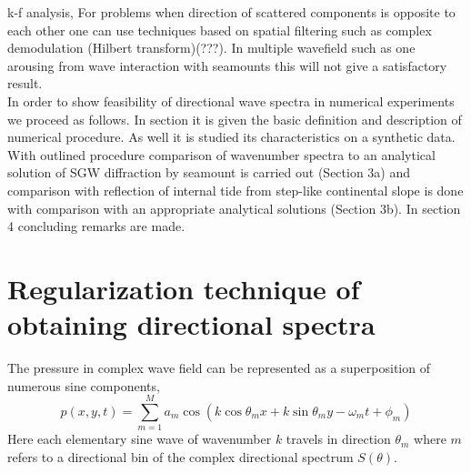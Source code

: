 k-f analysis, For problems when direction of scattered components is opposite to each other one can use techniques based on spatial filtering such as complex demodulation (Hilbert transform)\cite{mercier2008reflection}(???). In multiple wavefield such as one arousing from wave interaction with seamounts this will not give a satisfactory result.\\
In order to show feasibility of directional wave spectra in numerical experiments we proceed as follows. In section it is given the basic definition and description of numerical procedure. As well it is studied its characteristics on a synthetic data. With outlined procedure comparison of wavenumber spectra to an analytical solution of SGW diffraction by seamount is carried out (Section 3a) and comparison with reflection of internal tide from step-like continental slope is done with comparison with an appropriate analytical solutions (Section 3b). In section 4 concluding remarks are made.

\section{Regularization technique of obtaining directional spectra}
The pressure in complex wave field can be represented as a superposition of numerous sine components,
\begin{equation}
p(x,y,t) = \sum_{m = 1}^M a_{m} \cos (k \cos \theta_m x + k \sin \theta_m y - \omega_m t + \phi_m)
\end{equation}
Here each elementary sine wave of wavenumber $k$ travels in direction $\theta_m$ where $m$ refers to a directional bin of the complex directional spectrum $S(\theta)$.\\

